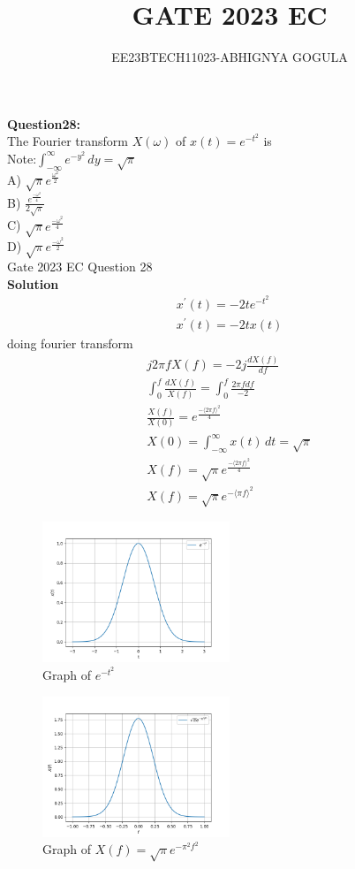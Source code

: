 \documentclass[journal,12pt,twocolumn]{IEEEtran}
\newcommand{\brak}[1]{\langle #1 \rangle}
\theoremstyle{remark}
\begin{document}

\vspace{3cm}
\title{\textbf{GATE 2023 EC}}
\author{EE23BTECH11023-ABHIGNYA GOGULA}
\maketitle
\newpage
\bigskip
\renewcommand{\thefigure}{\theenumi}
\renewcommand{\thetable}{\theenumi}
\textbf{Question28:}
\\
 The Fourier transform $X(\omega)$ of $x(t) = e^{-t^2}$ is\\
Note:$\int_{-\infty}^{\infty} e^{-y^2} \,dy = \sqrt{\pi}$ \\  
A) $\sqrt{\pi} e^{\frac{\omega^2}{2}}$ \\
B) $\frac{e^{\frac{-\omega^2}{4}}}{2\sqrt{\pi}}$ \\
C) $\sqrt{\pi} e^{\frac{-\omega^2}{4}}$ \\
D) $\sqrt{\pi} e^{\frac{-\omega^2}{2}}$\\
\hfill Gate 2023 EC Question 28\\
\textbf{Solution}
\fi
\begin{align}
x^{'}(t)=-2te^{-t^{2}}\\
x^{'}(t)=-2tx(t)
\end{align}
doing fourier transform 
\begin{align}
j 2 \pi f X(f)= -2j\frac{d X(f)}{df}\\
\int_{0}^{f} \frac{d X(f)}{X(f)}=\int_{0}^{f} \frac{2 \pi f df}{-2}\\
\frac{X(f)}{X(0)}=e^{\frac{-\brak {2 \pi f}^{2}}{4}}\\
X(0)=\int_{-\infty}^{\infty} x(t)\,dt = \sqrt{\pi}\\
X(f)=\sqrt{\pi}e^{\frac{-\brak {2 \pi f}^2}{4}}\\
X(f)=\sqrt{\pi}e^{-\brak{\pi f}^2}
\end{align}
\begin{figure}[h]
    \centering
    \includegraphics[width=0.5\textwidth]{2023/EC/28/figs/graph.png}
    \caption{Graph of $e^{-t^2}$}
    \label{fig:plot1}
\end{figure}
\begin{figure}[h]
    \centering
    \includegraphics[width=0.5\textwidth]{2023/EC/28/figs/graph1.png}
    \caption{Graph of $X(f) = \sqrt{\pi}e^{-\pi^2f^2}$}
    \label{fig:plot2}
\end{figure}
\end{document}
